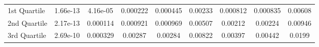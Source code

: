 {\begin{tabular} {lcccccccc}
\hspace{7pt}1st Quartile & \cellcolor{bronze!60}1.66e-13 & \cellcolor{gold!60}4.16e-05 & \cellcolor{silver!60}0.000222 & \cellcolor{silver!60}0.000445 & \cellcolor{silver!60}0.00233 & \cellcolor{silver!60}0.000812 & \cellcolor{bronze!60}0.000835 & \cellcolor{bronze!60}0.00608 \\
\hspace{7pt}2nd Quartile & 2.17e-13 & \cellcolor{gold!60}0.000114 & \cellcolor{gold!60}0.000921 & \cellcolor{gold!60}0.000969 & \cellcolor{bronze!60}0.00507 & \cellcolor{gold!60}0.00212 & \cellcolor{gold!60}0.00224 & \cellcolor{silver!60}0.00946 \\
\hspace{7pt}3rd Quartile & \cellcolor{gold!60}2.69e-10 & \cellcolor{silver!60}0.000329 & \cellcolor{silver!60}0.00287 & \cellcolor{gold!60}0.00284 & \cellcolor{gold!60}0.00822 & \cellcolor{bronze!60}0.00397 & \cellcolor{bronze!60}0.00442 & \cellcolor{silver!60}0.0199 \\
\bottomrule
\end{tabular}}
